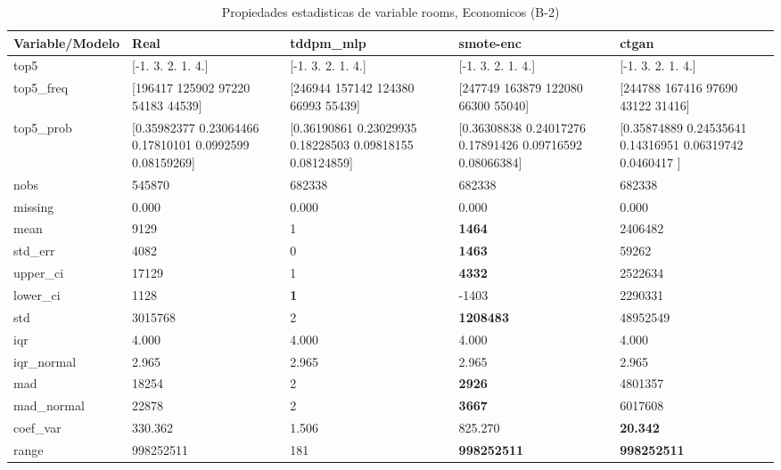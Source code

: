 \begin{table}[H]
\centering
\fontsize{8}{14}\selectfont
\caption{Propiedades  estadisticas de variable rooms, Economicos (B-2)}
\label{table-stats-economicos-b-2-rooms}
\begin{tabular}{|l|m{10em}|m{10em}|m{10em}|m{10em}|}
\hline
 \rowcolor[gray]{0.8}
Variable/Modelo & Real & tddpm\_mlp & smote-enc & ctgan \\
\hline top5 & [-1.  3.  2.  1.  4.] & [-1.  3.  2.  1.  4.] & [-1.  3.  2.  1.  4.] & [-1.  3.  2.  1.  4.] \\
\hline top5\_freq & [196417 125902  97220  54183  44539] & [246944 157142 124380  66993  55439] & [247749 163879 122080  66300  55040] & [244788 167416  97690  43122  31416] \\
\hline top5\_prob & [0.35982377 0.23064466 0.17810101 0.0992599  0.08159269] & [0.36190861 0.23029935 0.18228503 0.09818155 0.08124859] & [0.36308838 0.24017276 0.17891426 0.09716592 0.08066384] & [0.35874889 0.24535641 0.14316951 0.06319742 0.0460417 ] \\
\hline nobs & 545870 & 682338 & 682338 & 682338 \\
\hline missing & 0.000 & 0.000 & 0.000 & 0.000 \\
\hline mean & 9129 & 1 & \bfseries 1464 & \cellcolor[rgb]{0.9, 0.54, 0.52} 2406482 \\
\hline std\_err & 4082 & 0 & \bfseries 1463 & \cellcolor[rgb]{0.9, 0.54, 0.52} 59262 \\
\hline upper\_ci & 17129 & 1 & \bfseries 4332 & \cellcolor[rgb]{0.9, 0.54, 0.52} 2522634 \\
\hline lower\_ci & 1128 & \bfseries 1 & -1403 & \cellcolor[rgb]{0.9, 0.54, 0.52} 2290331 \\
\hline std & 3015768 & 2 & \bfseries 1208483 & \cellcolor[rgb]{0.9, 0.54, 0.52} 48952549 \\
\hline iqr & 4.000 & 4.000 & 4.000 & 4.000 \\
\hline iqr\_normal & 2.965 & 2.965 & 2.965 & 2.965 \\
\hline mad & 18254 & 2 & \bfseries 2926 & \cellcolor[rgb]{0.9, 0.54, 0.52} 4801357 \\
\hline mad\_normal & 22878 & 2 & \bfseries 3667 & \cellcolor[rgb]{0.9, 0.54, 0.52} 6017608 \\
\hline coef\_var & 330.362 & 1.506 & \cellcolor[rgb]{0.9, 0.54, 0.52} 825.270 & \bfseries 20.342 \\
\hline range & 998252511 & \cellcolor[rgb]{0.9, 0.54, 0.52} 181 & \bfseries 998252511 & \bfseries 998252511 \\

\end{tabular}
\end{table}
